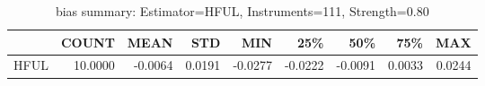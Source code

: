 \begin{table}[ht]
\centering
\caption{bias summary: Estimator=HFUL, Instruments=111, Strength=0.80}
\begin{tabular}{lrrrrrrrr}
\toprule
 & COUNT & MEAN & STD & MIN & 25\% & 50\% & 75\% & MAX \\
\midrule
HFUL & 10.0000 & -0.0064 & 0.0191 & -0.0277 & -0.0222 & -0.0091 & 0.0033 & 0.0244 \\
\bottomrule
\end{tabular}
\end{table}

